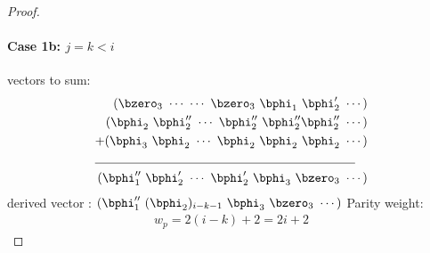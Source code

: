 \documentclass[11pt, oneside, dvipdfmx]{book}
\begin{document}
\begin{proof}
\paragraph{Case 1b: $j=k<i$\newline}
 vectors to sum:
\begin{align*}
(\bzero_{3}~\cdots~\cdots~\bzero_{3}~\bphi_1~\bphi'_2~\cdots)\\
(\bphi_2~\bphi''_2~\cdots~\bphi''_2~\bphi''_2\bphi''_2~\cdots)\\
+(\bphi_3~\bphi_2~\cdots~\bphi_2~\bphi_2~\bphi_2~\cdots)\\
\cline{1-2}
(\bphi''_1~\bphi'_2~\cdots~\bphi'_2~\bphi_3~\bzero_3~\cdots)
\end{align*}
derived vector : $(\bphi''_1~(\bphi_2)_{i-k-1}~\bphi_3~\bzero_3~\cdots)$\newline
Parity weight: \begin{equation}
\begin{split}
w_p=2(i-k)+2=2i+2
\end{split}
\end{equation}


\end{proof}
\end{document}
